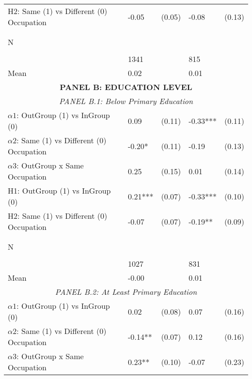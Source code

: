 \begin{tabular}{l*{4}{l}}
H2: Same (1) vs Different (0) Occupation&    -0.05   &   (0.05)&    -0.08   &   (0.13)\\
 
  \\\\[-0.5cm] N \\\\[-0.6cm]&     1341   &         &      815   &         \\
Mean            &     0.02&         &     0.01&         \\
 
 \midrule \midrule  \multicolumn{5}{c}{\textbf{PANEL B: EDUCATION LEVEL}} \\  \multicolumn{5}{c}{\textit{PANEL B.1: Below Primary Education}} \\  \midrule  
$\alpha1$: OutGroup (1) vs InGroup (0)&        0.09   &      (0.11)&       -0.33***&      (0.11)\\
$\alpha2$: Same (1) vs Different (0) Occupation&       -0.20*  &      (0.11)&       -0.19   &      (0.13)\\
 
$\alpha3$: OutGroup x Same Occupation&     0.25   &   (0.15)&     0.01   &   (0.14)\\
 
H1: OutGroup (1) vs InGroup (0)&     0.21***&   (0.07)&    -0.33***&   (0.10)\\
 
H2: Same (1) vs Different (0) Occupation&    -0.07   &   (0.07)&    -0.19** &   (0.09)\\
 
  \\\\[-0.5cm] N \\\\[-0.6cm]&     1027   &         &      831   &         \\
Mean            &    -0.00&         &     0.01&         \\
 
  \multicolumn{5}{c}{\textit{PANEL B.2: At Least Primary Education}} \\  \midrule  
$\alpha1$: OutGroup (1) vs InGroup (0)&        0.02   &      (0.08)&        0.07   &      (0.16)\\
$\alpha2$: Same (1) vs Different (0) Occupation&       -0.14** &      (0.07)&        0.12   &      (0.16)\\
 
$\alpha3$: OutGroup x Same Occupation&     0.23** &   (0.10)&    -0.07   &   (0.23)\\
 

\end{tabular}
